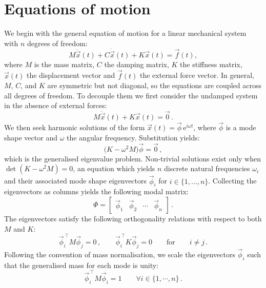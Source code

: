 \documentclass[../Thesis-IJspeert.tex]{subfiles}
\begin{document}
\section{Equations of motion}
\label{eqsofmotion}
We begin with the general equation of motion for a linear mechanical system with $n$ degrees of freedom:
\begin{equation}
\label{ndogeq}
M  \ddot{\vec{x}}(t) + C  \dot{\vec{x}}(t) + K  \vec{x}(t) = \vec{f}(t),
\end{equation}
where $M$ is the mass matrix, $C$ the damping matrix, $K$ the stiffness matrix, $\vec{x}(t)$ the displacement vector and $\vec{f}(t)$ the external force vector. In general, $M$, $C$, and $K$ are symmetric but not diagonal, so the equations are coupled across all degrees of freedom. To decouple them we first consider the undamped system in the absence of external forces:
\begin{equation}
M \ddot{\vec{x}}(t) + K \vec{x}(t) = \vec{0}\,.
\end{equation}
We then seek harmonic solutions of the form $\vec{x}(t) = \vec{\phi} \, \mathrm{e}^{i \omega t}$, where $\vec{\phi}$ is a mode shape vector and $\omega$ the angular frequency. Substitution yields:
\begin{equation}
\bigl( K - \omega^{2} M \bigr)  \vec{\phi} = \vec{0}\,,
\end{equation}
which is the generalised eigenvalue problem. Non-trivial solutions exist only when $\det(K - \omega^{2} M)=0$, an equation which yields $n$ discrete natural frequencies $\omega_{i}$ and their associated mode shape eigenvectors $\vec{\phi}_{i}$ for $i \in \{ 1, \dots, n\}$. Collecting the eigenvectors as columns yields the following modal matrix:
\begin{equation}
\Phi = \begin{bmatrix}  \vec{\phi}_{1} & \vec{\phi}_{2} & \cdots & \vec{\phi}_{n} \end{bmatrix}\,.
\end{equation}
The eigenvectors satisfy the following orthogonality relations with respect to both $M$ and $K$:
\begin{equation}
\vec{\phi}_{i}^{\,\top} \!M \vec{\phi}_{j} = 0\,, \qquad \vec{\phi}_{i}^{\,\top} \!K \vec{\phi}_{j} = 0 \qquad \text{for} \qquad i \neq j\,.
\end{equation}
Following the convention of mass normalisation, we scale the eigenvectors $\vec{\phi}_i$ such that the generalised mass for each mode is unity:
\begin{equation}
\label{massnormalisation}
\vec{\phi}_i^{\,\top} \!M \vec{\phi}_i = 1 \qquad \forall i\in\{1,\cdots,n\}\,.
\end{equation}
\end{document}
